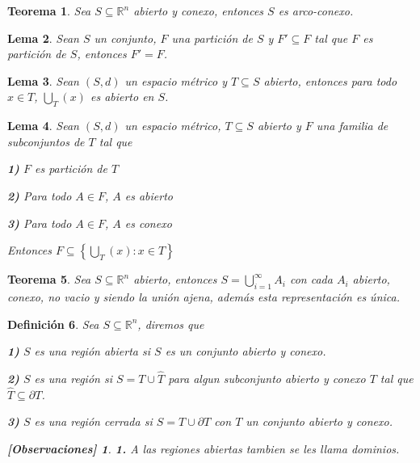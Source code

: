 \documentclass[oneside]{book} %
\theoremstyle{Teorema}
\newtheorem{Definicion}{Definición}[chapter]
\newtheorem{Teorema}[Definicion]{Teorema}
\newtheorem{Lema}[Definicion]{Lema}
\theoremstyle{Ejemplos}
\theoremstyle{[Obs]}
\newtheorem*{Obs}{[Observaciones]}
\renewcommand{\{}{\left\lbrace} %
\renewcommand{\}}{\right\rbrace} %
\renewcommand{\u}{\cup} %
\newcommand{\U}{\bigcup} %
\renewcommand{\sc}{\subseteq} %
\newcommand{\Rn}{\mathbb{R}^n} %
\begin{document}
			\begin{Teorema}\setlength{\parindent}{0em}
				
				Sea $S \sc \Rn$ abierto y conexo, entonces $S$ es arco-conexo. 

			\end{Teorema}

			\begin{Lema}\setlength{\parindent}{0em}
				
				Sean $S$ un conjunto, $F$ una partición de $S$ y $F' \sc F$ tal que $F$ es partición de $S$, entonces $F' = F$. 

			\end{Lema}

			\begin{Lema}\setlength{\parindent}{0em}
				
				Sean $(S, d)$ un espacio métrico y $T \sc S$ abierto, entonces para todo $x \in T$, $\U_{T}(x)$ es abierto en $S$. 

			\end{Lema}

			\begin{Lema}\setlength{\parindent}{0em}
				
				Sean $(S, d)$ un espacio métrico, $T \sc S$ abierto y $F$ una familia de subconjuntos de $T$ tal que 

				\textbf{1)} $F$ es partición de $T$ 

				\textbf{2)} Para todo $A \in F$, $A$ es abierto 

				\textbf{3)} Para todo $A \in F$, $A$ es conexo 

				Entonces $F \sc \{ \U_{T}(x) : x \in T \}$ 

			\end{Lema}

			\begin{Teorema}\setlength{\parindent}{0em}
				
				Sea $S \sc \Rn$ abierto, entonces $S = \displaystyle\U_{i = 1}^{\infty} A_i$ con cada $A_i$ abierto, conexo, no vacio y siendo la unión ajena, además esta representación es única. 

			\end{Teorema}

			\begin{Definicion}\setlength{\parindent}{0em}
				
				Sea $S \sc \Rn$, diremos que 

				\textbf{1)} $S$ es una región abierta si $S$ es un conjunto abierto y conexo. 

				\textbf{2)} $S$ es una región si $S = T \u \hat{T}$ para algun subconjunto abierto y conexo $T$ tal que $\hat{T} \sc \partial T$. 

				\textbf{3)} $S$ es una región cerrada si $S = T \u \partial T$ con $T$ un conjunto abierto y conexo. 

				\begin{Obs}
				
					\textbf{1.} A las regiones abiertas tambien se les llama dominios. 
				
				\end{Obs}

			\end{Definicion}
\end{document}
